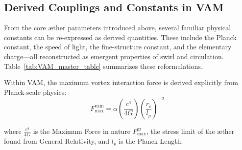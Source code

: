\subsection*{Derived Couplings and Constants in VAM}
From the core æther parameters introduced above, several familiar physical constants can be re-expressed as derived quantities. These include the Planck constant, the speed of light, the fine-structure constant, and the elementary charge—all reconstructed as emergent properties of swirl and circulation. Table~\ref{tab:VAM_master_table} summarizes these reformulations.

Within VAM, the maximum vortex interaction force is derived explicitly from Planck-scale physics:
\begin{equation}
    F^{\text{vam}}_\text{max} = \alpha \left(\frac{c^4}{4G}\right)  \left(\frac{r_c}{l_p}\right)^{-2}
\end{equation}

where $\frac{c^4}{4G}$ is the Maximum Force in nature $F^{\text{gr}}_\text{max}$, the stress limit of the æther found from General Relativity, and $l_p$ is the Planck Length.






